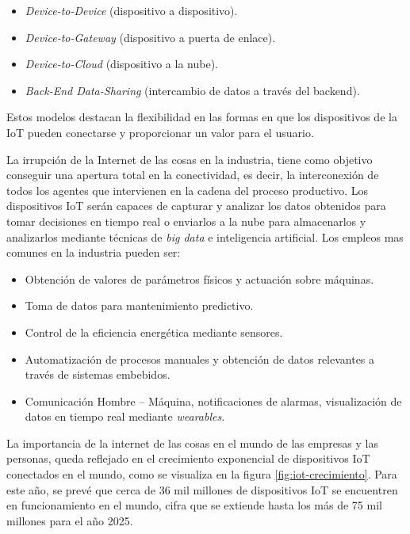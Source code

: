 \begin{itemize}
	\item \textit{Device-to-Device} (dispositivo a dispositivo).
	\item \textit{Device-to-Gateway} (dispositivo a puerta de enlace).
	\item \textit{Device-to-Cloud} (dispositivo a la nube).
	\item \textit{Back-End Data-Sharing} (intercambio de datos a través del backend).
\end{itemize}

Estos modelos destacan la flexibilidad en las formas en que los dispositivos de la IoT pueden conectarse y proporcionar un valor para el usuario.

La irrupción de la Internet de las cosas en la industria, tiene como objetivo conseguir una apertura total en la conectividad, es decir, la interconexión de todos los agentes que intervienen en la cadena del proceso productivo. Los dispositivos IoT serán capaces de capturar y analizar los datos obtenidos para tomar decisiones en tiempo real o enviarlos a la nube para almacenarlos y analizarlos mediante técnicas de \textit{big data}  e inteligencia artificial. Los empleos mas comunes en la industria pueden ser:
\begin{itemize}
	\item Obtención de valores de parámetros físicos y actuación sobre máquinas.
	\item Toma de datos para mantenimiento predictivo. 
	\item Control de la eficiencia energética mediante sensores.
	\item Automatización de procesos manuales y obtención de datos relevantes a través de sistemas embebidos.
	\item Comunicación Hombre – Máquina, notificaciones de alarmas, visualización de datos en tiempo real mediante \textit{wearables}.
\end{itemize}

La importancia de la internet de las cosas en el mundo de las empresas y las personas, queda reflejado en el crecimiento exponencial de dispositivos IoT conectados en el mundo, como se visualiza en la figura  \ref{fig:iot-crecimiento}. Para este año, se prevé que cerca de 36 mil millones de dispositivos IoT se encuentren en funcionamiento en el mundo, cifra que se extiende hasta los más de 75 mil millones para el año 2025.

